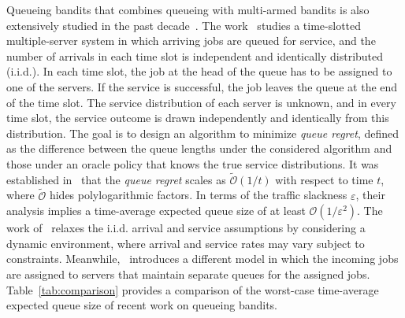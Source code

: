 \documentclass[12pt,draftcls, onecolumn]{IEEEtran}
\begin{document}
Queueing bandits that combines queueing with multi-armed bandits is also extensively studied in the past decade~\cite{Krishnasamy2020,Fu2023,Freund2023,Huang2024,Nguyen,Yang2023}. The work~\cite{Krishnasamy2016} studies a time-slotted multiple-server system in which arriving jobs are queued for service, and the number of arrivals in each time slot is independent and identically distributed (i.i.d.). In each time slot, the job at the head of the queue has to be assigned to one of the servers. If the service is successful, the job leaves the queue at the end of the time slot. The service distribution of each server is unknown, and in every time slot, the service outcome is drawn independently and identically from this distribution. The goal is to design an algorithm to minimize \emph{queue regret}, defined as the difference between the queue lengths under the considered algorithm and those under an oracle policy that knows the true service distributions. It was established in~\cite{Krishnasamy2016} that the \emph{queue regret} scales as $\tilde{\mathcal{O}}(1/t)$ with respect to time $t$, where $\tilde{\mathcal{O}}$ hides polylogarithmic factors. In terms of the traffic slackness $\varepsilon$, their analysis implies a time-average expected queue size of at least $\mathcal{O}(1/\varepsilon^2)$. The work of~\cite{Huang2024} relaxes the i.i.d. arrival and service assumptions by considering a dynamic environment, where arrival and service rates may vary subject to constraints. Meanwhile,~\cite{Fu2023} introduces a different model in which the incoming jobs are assigned to servers that maintain separate queues for the assigned jobs. Table~\ref{tab:comparison} provides a comparison of the worst-case time-average expected queue size of recent work on queueing bandits.
\end{document}
